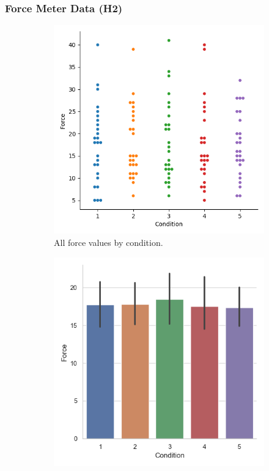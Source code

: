 \subsubsection{Force Meter Data (H2)}
\begin{figure}[H]
\hspace*{\fill}
     \begin{subfigure}[b]{0.4\textwidth}
         \centering
         \vspace*{-10mm}
         \includegraphics[width=\textwidth]{Files/Plots/force_by_cond_swarm.png}
         \caption{All force values by condition.}
         \label{fig:allForceSwarm}
     \end{subfigure}
     \hspace*{\fill}
     \begin{subfigure}[b]{0.4\textwidth}
         \centering
         \includegraphics[width=\textwidth]{Files/Plots/force_mean_by_condition.png}

\end{subfigure}
\end{figure}
